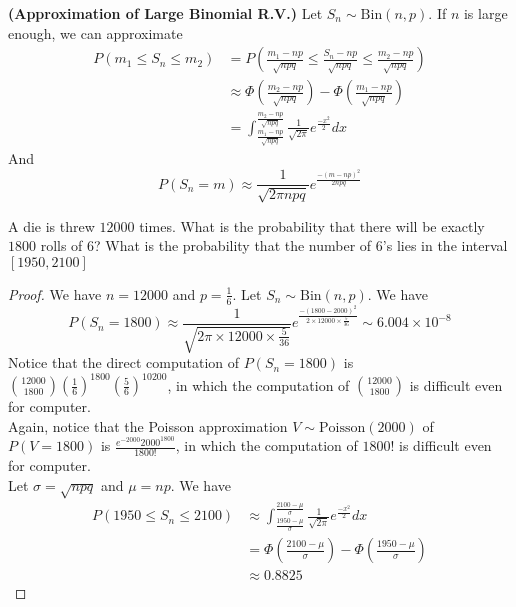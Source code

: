 \documentclass{report}
\begin{document}
\begin{corollary}
\label{2.5.4}
\textbf{(Approximation of Large Binomial R.V.)} Let $S_n\sim \text{Bin}\left(n,p \right)$. If $n$ is large enough, we can approximate
 \begin{align*}
P\left(m_1\leq S_n\leq m_2 \right)&=P\left(\frac{m_1-np}{\sqrt{npq} }\leq \frac{S_n-np}{\sqrt{npq} }\leq \frac{m_2-np}{\sqrt{npq} } \right)\\
&\approx \Phi\left(\frac{m_2-np}{\sqrt{npq} } \right)-\Phi\left( \frac{m_1-np}{\sqrt{npq} } \right)\\
&=\int_{\frac{m_1-np}{\sqrt{npq} }}^{\frac{m_2-np}{\sqrt{npq} } }  \frac{1}{\sqrt{2\pi} }e^{\frac{-x^2}{2}}dx
\end{align*}
And 
\begin{equation*}
P\left(S_n=m \right)\approx\frac{1}{\sqrt{2\pi npq} }e^{\frac{-\left(m-np \right)^2}{2npq}}
\end{equation*}
\end{corollary}
\begin{question}{}{}
A die is threw $12000$ times. What is the probability that there will be exactly $1800$ rolls of $6$? What is the probability that the number of $6$'s lies in the interval  $\left[1950,2100 \right]$
\end{question}
\begin{proof}
We have $n=12000$ and  $p=\frac{1}{6}$. Let $S_n\sim\text{Bin}\left(n,p \right)$. We have 
\begin{equation*}
P\left(S_n=1800 \right)\approx \frac{1}{\sqrt{2\pi \times 12000\times \frac{5}{36}}}e^{\frac{-\left(1800-2000 \right)^2}{2\times 12000\times \frac{5}{36}}}\sim 6.004\times 10^{-8}
\end{equation*}
Notice that the direct computation of $P\left(S_n=1800 \right)$ is $\binom{12000}{1800}\left(\frac{1}{6} \right)^{1800}\left(\frac{5}{6} \right)^{10200}$, in which the computation of $\binom{12000}{1800}$ is difficult even for computer.\\

Again, notice that the Poisson approximation $V\sim \text{Poisson}\left(2000 \right)$ of $P\left(V=1800 \right)$ is $\frac{e^{-2000}2000^{1800}}{1800!}$, in which the computation of $1800!$ is difficult even for computer.\\

Let $\sigma=\sqrt{npq} $ and $\mu=np$. We have 
\begin{align*}
  P\left(1950\leq S_n\leq 2100 \right)&\approx \int^{\frac{2100-\mu}{\sigma}}_{\frac{1950-\mu}{\sigma}} \frac{1}{\sqrt{2\pi} }e^{\frac{-x^2}{2}}dx\\
&=\Phi\left(\frac{2100-\mu}{\sigma} \right)-\Phi\left(\frac{1950-\mu}{\sigma} \right)\\
&\approx 0.8825
\end{align*}
\end{proof}
\end{document}
